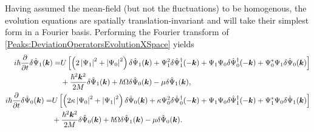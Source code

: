 Having assumed the mean-field (but not the fluctuations) to be homogenous, the evolution equations are spatially translation-invariant and will take their simplest form in a Fourier basis. Performing the Fourier transform of \eqref{Peaks:DeviationOperatorsEvolutionXSpace} yields
\begin{subequations}
    \label{Peaks:DeviationOperatorsEvolutionKSpace}
    \begin{align}
        \begin{split}
            i \hbar \frac{\partial }{\partial t}\delta \hat{\Psi}_1(\vect{k}) =& U\left[ \left(2\abs{\Psi_1}^2+\abs{\Psi_0}^2 \right)\delta \hat{\Psi}_1(\vect{k}) + \Psi_1^2\delta\hat{\Psi}_1^\dagger(-\vect{k}) + \Psi_1\Psi_0\delta\hat{\Psi}_0^\dagger(-\vect{k}) + \Psi_0^*\Psi_1\delta\hat{\Psi}_0(\vect{k})\right]\\
                    & +\frac{\hbar^2 \vect{k}^2}{2M} \delta \hat{\Psi}_1(\vect{k}) +\hbar \Omega\delta\hat{\Psi}_0(\vect{k})- \mu \delta \hat{\Psi}_1(\vect{k}),
        \end{split}\\
        \begin{split}
        i \hbar \frac{\partial}{\partial t} \delta \hat{\Psi}_0(\vect{k}) =& U\left[\left(2\kappa \abs{\Psi_0}^2 +\abs{\Psi_1}^2\right)\delta\hat{\Psi}_0(\vect{k}) + \kappa \Psi_0^2 \delta\hat{\Psi}_0^\dagger(-\vect{k}) + \Psi_1\Psi_0\delta\hat{\Psi}_1^\dagger(-\vect{k}) + \Psi_1^*\Psi_0\delta\hat{\Psi}_1(\vect{k})\right]\\
                    & +\frac{\hbar^2 \vect{k}^2}{2M} \delta \hat{\Psi}_0(\vect{k}) +\hbar \Omega\delta\hat{\Psi}_1(\vect{k}) - \mu \delta\hat{\Psi}_0(\vect{k}).
        \end{split}
    \end{align}
\end{subequations}


